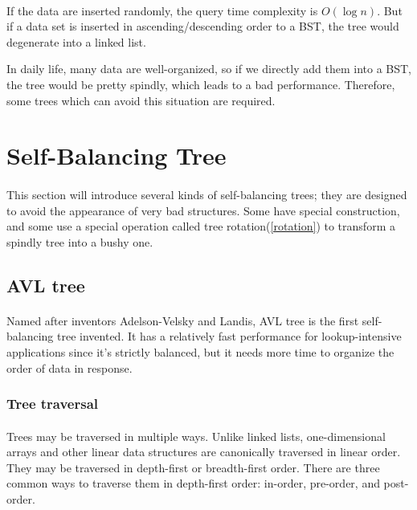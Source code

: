 \documentclass{article}
\begin{document}
\paragraph{}
If the data are inserted randomly, the query time complexity is $O(\log{n})$. But if a data set is inserted in ascending/descending order to a BST, the tree would degenerate into a linked list.

In daily life, many data are well-organized, so if we directly add them into a BST, the tree would be pretty spindly, which leads to a bad performance. Therefore, some trees which can avoid this situation are required.

\newpage


\section{Self-Balancing Tree}
\paragraph{}
This section will introduce several kinds of self-balancing trees; they are designed to avoid the appearance of very bad structures. Some have special construction, and some use a special operation called tree rotation(\ref{rotation}) to transform a spindly tree into a bushy one.

\subsection{AVL tree}

\paragraph{}
Named after inventors Adelson-Velsky and Landis, AVL tree is the first self-balancing tree invented. It has a relatively fast performance for lookup-intensive applications since it's strictly balanced, but it needs more time to organize the order of data in response.

\subsubsection{Tree traversal}

\paragraph{}
Trees may be traversed in multiple ways. Unlike linked lists, one-dimensional arrays and other linear data structures are canonically traversed in linear order. They may be traversed in depth-first or breadth-first order. There are three common ways to traverse them in depth-first order: in-order, pre-order, and post-order.
\end{document}
